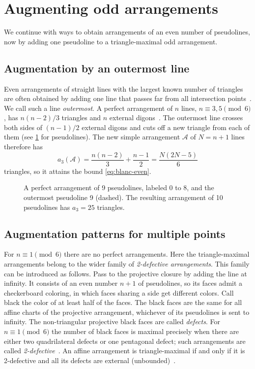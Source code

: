 \section{Augmenting odd arrangements}\label{sec:augment}

We continue with ways to obtain arrangements of an even number of pseudolines, now by adding one pseudoline to a triangle-maximal odd arrangement.

\subsection{Augmentation by an outermost line}

Even arrangements of straight lines with the largest known number of triangles are often obtained by adding one line that passes far from all intersection points~\cite{bbl,blanc11,savchuk25}. We call such a line \emph{outermost}. A perfect arrangement of $n$ lines, $n\equiv3,5\pmod 6$, has $n(n-2)/3$ triangles and $n$ external digons~\cite[Lemma~2.3]{pu26b}.
The outermost line crosses both sides of $(n-1)/2$ external digons and cuts off a new triangle from each of them (see \cref{fig:outermost} for pseudolines).
The new simple arrangement $\mathcal{A}$ of $N=n+1$ lines therefore has
\[
a_3(\mathcal{A})=\frac{n(n-2)}3+\frac{n-1}2=\frac{N(2N-5)}6
\]
triangles, so it attains the bound \eqref{eq:blanc-even}.

\begin{figure}[H]
\centering
{}
\begin{minipage}{0.85\linewidth}

\end{minipage}
\caption{A perfect arrangement of 9 pseudolines, labeled 0 to 8, and the outermost pseudoline 9 (dashed).
The resulting arrangement of 10 pseudolines has $a_3=25$ triangles.}
\label{fig:outermost}
\end{figure}

\subsection{Augmentation patterns for multiple points}\label{sec:augment-patterns}

For $n\equiv1\pmod 6$ there are no perfect arrangements. Here the triangle-maximal arrangements belong to the wider family of \emph{2-defective arrangements}. This family can be introduced as follows. Pass to the projective closure by adding the line at infinity. It consists of an even number $n+1$ of pseudolines, so its faces admit a checkerboard coloring, in which faces sharing a side get different colors. Call black the color of at least half of the faces. The black faces are the same for all affine charts of the projective arrangement, whichever of its pseudolines is sent to infinity. The non-triangular projective black faces are called \emph{defects}. For $n\equiv1\pmod 6$ the number of black faces is maximal precisely when there are either two quadrilateral defects or one pentagonal defect; such arrangements are called \emph{2-defective}~\cite[Lemma~2.7 and Definition~2.8]{pu26b}. An affine arrangement is triangle-maximal if and only if it is 2-defective and all its defects are external (unbounded)~\cite[Lemma~2.9]{pu26b}.

